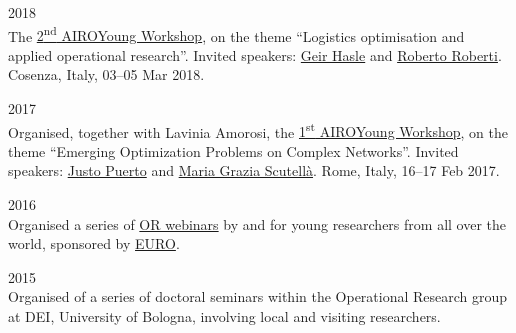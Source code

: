\begin{paracol}{2}
  2018
\switchcolumn
  \\
  The \href{https://workshop.airoyoung.org/2018}{2\textsuperscript{nd} AIROYoung Workshop}, on the theme ``Logistics optimisation and applied operational research''.
  Invited speakers: \href{https://scholar.google.it/citations?user=GXRnRZgAAAAJ}{Geir Hasle} and \href{https://scholar.google.it/citations?user=pNQZmwIAAAAJ}{Roberto Roberti}.
  Cosenza, Italy, 03--05 Mar 2018.
\end{paracol}

\begin{paracol}{2}
  2017
\switchcolumn
  \\
    Organised, together with Lavinia Amorosi, the \href{https://workshop.airoyoung.org/2017}{1\textsuperscript{st} AIROYoung Workshop}, on the theme ``Emerging Optimization Problems on Complex Networks''.
    Invited speakers: \href{https://scholar.google.com/citations?user=koF66usAAAAJ}{Justo Puerto} and \href{https://scholar.google.com/citations?user=PcGjfV8AAAAJ}{Maria Grazia Scutellà}.
    Rome, Italy, 16--17 Feb 2017.
\end{paracol}

\begin{paracol}{2}
  2016
\switchcolumn
  \\
  Organised a series of \href{https://www.airoyoung.org/resources/euro-seminars}{OR webinars} by and for young researchers from all over the world, sponsored by \href{https://www.euro-online.org}{EURO}.
\end{paracol}

\begin{paracol}{2}
  2015
\switchcolumn
  \\
  Organised of a series of doctoral seminars within the Operational Research group at DEI, University of Bologna, involving local and visiting researchers.
\end{paracol}